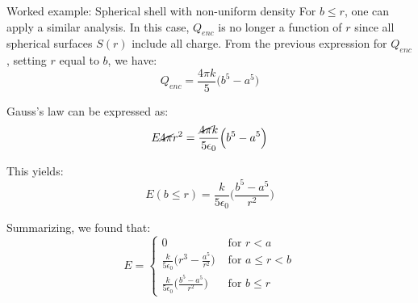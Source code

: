 {\begin{frame}{Worked example: Spherical shell with non-uniform density}
  For $b \le r$, one can apply a similar analysis. In this case,
  $Q_{enc}$ is no longer a function of $r$
  since all spherical surfaces $S(r)$ include all charge.
  From the previous expression for $Q_{enc}$,
  setting $r$ equal to $b$, we have:
  \begin{equation*}
    Q_{enc} =
      \frac{4\pi k}{5} \Big(b^5 - a^5\Big)
  \end{equation*}

  Gauss's law can be expressed as:
  \begin{equation*}
    E \cancel{4\pi} r^2 =
     \frac{\cancel{4\pi} k}{5 \epsilon_0} \Big(b^5 - a^5\Big)
  \end{equation*}

  This yields:
  \begin{equation*}
    E (b \le r)= \frac{k}{5 \epsilon_0} \Big(\frac{b^5 - a^5}{r^2}\Big)
  \end{equation*}

  Summarizing, we found that:
  \begin{equation*}
    \displaystyle
    E =
      \begin{cases}
        0 & \text{ for } r < a\\
        \frac{k}{5 \epsilon_0} \Big(r^3 - \frac{a^5}{r^2}\Big) & \text{ for } a \le r < b\\
        \frac{k}{5 \epsilon_0} \Big(\frac{b^5 - a^5}{r^2}\Big) & \text{ for } b \le r
      \end{cases}
  \end{equation*}

\end{frame}

} %


%
%

